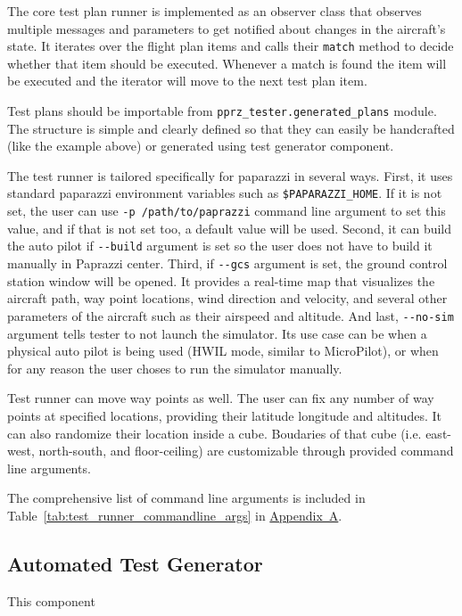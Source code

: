 The core test plan runner is implemented as an observer class that observes multiple messages and parameters to get notified about changes in the aircraft's state. It iterates over the flight plan items and calls their \verb|match| method to decide whether that item should be executed. Whenever a match is found the item will be executed and the iterator will move to the next test plan item. 

Test plans should be importable from \verb|pprz_tester.generated_plans| module. The structure is simple and clearly defined so that they can easily be handcrafted (like the example above) or generated using test generator component.

The test runner is tailored specifically for paparazzi in several ways. First, it uses standard paparazzi environment variables such as \verb|$PAPARAZZI_HOME|. If it is not set, the user can use \verb|-p /path/to/paprazzi| command line argument to set this value, and if that is not set too, a default value will be used. Second, it can build the auto pilot if \verb|--build| argument is set so the user does not have to build it manually in Paprazzi center. Third, if \verb|--gcs| argument is set, the ground control station window will be opened. It provides a real-time map that visualizes the aircraft path, way point locations, wind direction and velocity, and several other parameters of the aircraft such as their airspeed and altitude. And last, \verb|--no-sim| argument tells tester to not launch the simulator. Its use case can be when a physical auto pilot is being used (HWIL mode, similar to MicroPilot), or when for any reason the user choses to run the simulator manually. 

Test runner can move way points as well. The user can fix any number of way points at specified locations, providing their latitude longitude and altitudes. It can also randomize their location inside a cube. Boudaries of that cube (i.e. east-west, north-south, and floor-ceiling) are customizable through provided command line arguments.

The comprehensive list of command line arguments is included in Table~\ref{tab:test_runner_commandline_args} in \hyperref[appendixa]{Appendix~A}.


\subsection{Automated Test Generator}
This component 
